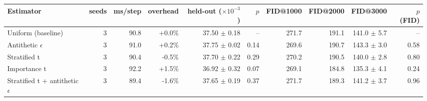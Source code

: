 \begin{tabular}{lrrrrrrrrr}
\toprule
Estimator & seeds & ms/step & overhead & held-out ($\times 10^{-3}$) & $p$ & FID@1000 & FID@2000 & FID@3000 & $p$ (FID) \\
\midrule
Uniform (baseline) & 3 & 90.8 & +0.0\% & 37.50 $\pm$ 0.18 & -- & 271.7 & 191.1 & 141.0 $\pm$ 5.7 & -- \\
Antithetic $\epsilon$ & 3 & 91.0 & +0.2\% & 37.75 $\pm$ 0.02 & 0.14 & 269.6 & 190.7 & 143.3 $\pm$ 3.0 & 0.58 \\
Stratified t & 3 & 90.4 & -0.5\% & 37.70 $\pm$ 0.22 & 0.29 & 270.2 & 190.5 & 140.0 $\pm$ 2.8 & 0.80 \\
Importance t & 3 & 92.2 & +1.5\% & 36.92 $\pm$ 0.32 & 0.07 & 269.1 & 184.8 & 135.3 $\pm$ 4.1 & 0.24 \\
Stratified t + antithetic $\epsilon$ & 3 & 89.4 & -1.6\% & 37.65 $\pm$ 0.19 & 0.37 & 271.7 & 189.3 & 141.2 $\pm$ 3.7 & 0.96 \\
\bottomrule
\end{tabular}
